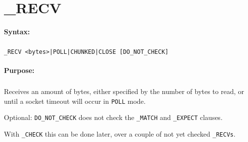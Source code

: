
\newpage
\section{\_RECV}
\label{cmd:_RECV}

\paragraph{Syntax:}
\subparagraph{}
\texttt{\_RECV <bytes>|POLL|CHUNKED|CLOSE [DO\_NOT\_CHECK]}

\paragraph{Purpose:}
\subparagraph{}
Receives an amount of bytes, either specified by the number of bytes to read, 
or until a socket timeout will occur in \texttt{POLL} mode.

Optional: \texttt{DO\_NOT\_CHECK} does not check the \texttt{\_MATCH} and \texttt{\_EXPECT} clauses. 

With \texttt{\_CHECK} this can be done later, over a couple of not yet checked \texttt{\_RECVs}.


